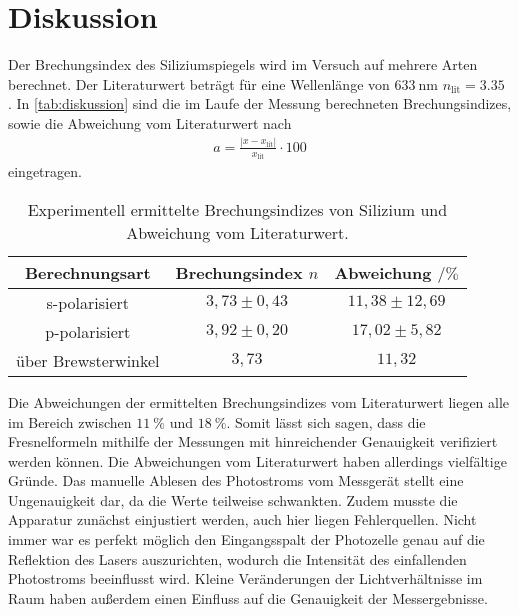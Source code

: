 \section{Diskussion}
\label{sec:Diskussion}

Der Brechungsindex des Siliziumspiegels wird im Versuch auf mehrere Arten berechnet.
Der Literaturwert beträgt für eine Wellenlänge von $\qty{633}{\nano\meter}$ $n_{\text{lit}}= 3.35$ \cite{BrechungSilizium}.
In \autoref{tab:diskussion} sind die im Laufe der Messung berechneten Brechungsindizes, sowie die Abweichung
vom Literaturwert nach 
\begin{align*}
    a=\frac{|x-x_{\text{lit}}|}{x_{\text{lit}}}\cdot 100 \label{eqn:abweich}
\end{align*}
eingetragen.

\begin{table}[H]
    \centering
    \caption{Experimentell ermittelte Brechungsindizes von Silizium und Abweichung vom Literaturwert.}
    \label{tab:diskussion}
    \begin{tabular}{c c c}
        \toprule
       {Berechnungsart}& {Brechungsindex $n$} & {Abweichung $ / \si{\percent}$} \\
        \midrule
        {s-polarisiert} & $3,73 \pm 0,43 $ & $11,38 \pm 12,69$ \\
        {p-polarisiert} & $3,92 \pm 0,20$ & $17,02 \pm 5,82 $ \\
        {über Brewsterwinkel} & $3,73$ & $11,32$ \\  
        \bottomrule
    \end{tabular}
  \end{table}

Die Abweichungen der ermittelten Brechungsindizes vom Literaturwert liegen alle im Bereich zwischen $\qty{11}{\percent}$ und $\qty{18}{\percent}$.
Somit lässt sich sagen, dass die Fresnelformeln mithilfe der Messungen mit hinreichender Genauigkeit verifiziert werden können.
Die Abweichungen vom Literaturwert haben allerdings vielfältige Gründe.
Das manuelle Ablesen des Photostroms vom Messgerät stellt eine Ungenauigkeit dar, da die Werte teilweise schwankten.
Zudem musste die Apparatur zunächst einjustiert werden, auch hier liegen Fehlerquellen.
Nicht immer war es perfekt möglich den Eingangsspalt der Photozelle genau auf die Reflektion des Lasers auszurichten, wodurch die Intensität des
einfallenden Photostroms beeinflusst wird.
Kleine Veränderungen der Lichtverhältnisse im Raum haben außerdem einen Einfluss auf die Genauigkeit der Messergebnisse.

